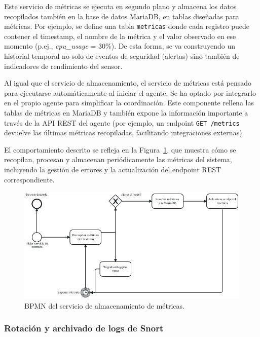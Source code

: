 \documentclass[11pt,a4paper,twoside]{report}
\begin{document}
Este servicio de métricas se ejecuta en segundo plano y almacena los datos recopilados también en la base de datos MariaDB, en tablas diseñadas para métricas. Por ejemplo, se define una tabla \texttt{metricas} donde cada registro puede contener el timestamp, el nombre de la métrica y el valor observado en ese momento (p.ej., \textit{cpu\_usage} = 30\%). De esta forma, se va construyendo un historial temporal no solo de eventos de seguridad (alertas) sino también de indicadores de rendimiento del sensor.\newline

Al igual que el servicio de almacenamiento, el servicio de métricas está pensado para ejecutarse automáticamente al iniciar el agente. Se ha optado por integrarlo en el propio agente para simplificar la coordinación. Este componente rellena las tablas de métricas en MariaDB y también expone la información importante a través de la API REST del agente (por ejemplo, un endpoint \verb|GET /metrics| devuelve las últimas métricas recopiladas, facilitando integraciones externas).\newline

El comportamiento descrito se refleja en la Figura~\ref{fig:bpmn-servicio-metricas}, que muestra cómo se recopilan, procesan y almacenan periódicamente las métricas del sistema, incluyendo la gestión de errores y la actualización del endpoint REST correspondiente.

\begin{figure}[H]
	\centering
	\includegraphics[width=1\textwidth]{documento/24.png}
	\caption{BPMN del servicio de almacenamiento de métricas.}
	\label{fig:bpmn-servicio-metricas}
\end{figure}


\subsubsection{Rotación y archivado de logs de Snort}
\end{document}
